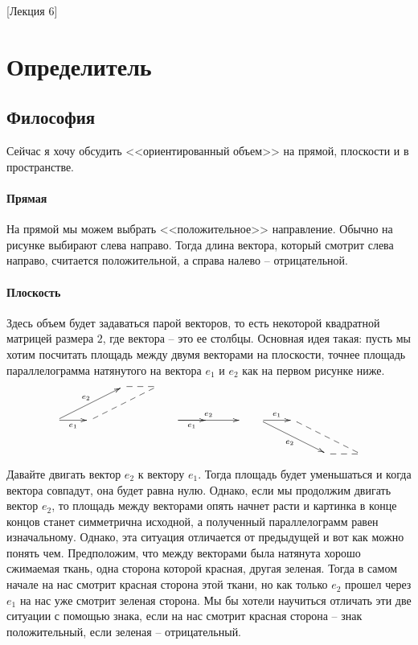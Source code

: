 [Лекция 6]

\newpage

\section{Определитель}

\subsection{Философия}

Сейчас я хочу обсудить <<ориентированный объем>> на прямой, плоскости и в пространстве. 

\paragraph{Прямая}

 На прямой мы можем выбрать <<положительное>> направление.
 Обычно на рисунке выбирают слева направо.
 Тогда длина вектора, который смотрит слева направо, считается положительной, а справа налево -- отрицательной.

\paragraph{Плоскость}

Здесь объем будет задаваться парой векторов, то есть некоторой квадратной матрицей размера $2$, где вектора -- это ее столбцы.
Основная идея такая: пусть мы хотим посчитать площадь между двумя векторами на плоскости, точнее площадь параллелограмма натянутого на вектора $e_1$ и $e_2$ как на первом рисунке ниже.
\[
\xymatrix{
	{}&{}&{}\ar@{--}[r]&{}\\
	{}\ar[urr]^{e_2}\ar[r]_{e_1}&{}\ar@{--}[urr]&{}&{}\\
	{}&{}&{}&{}\\
}\quad
\xymatrix{
	{}&{}&{}\\
	{}\ar[rr]^{e_2}\ar[r]_{e_1}&{}&{}\\
	{}&{}&{}\\
}\quad
\xymatrix{
	{}&{}&{}&{}\\
	{}\ar[drr]_{e_2}\ar[r]^{e_1}&{}\ar@{--}[drr]&{}&{}\\
	{}&{}&{}\ar@{--}[r]&{}\\
}
\]
Давайте двигать вектор $e_2$ к вектору $e_1$.
Тогда площадь будет уменьшаться и когда вектора совпадут, она будет равна нулю.
Однако, если мы продолжим двигать вектор $e_2$, то площадь между векторами опять начнет расти и картинка в конце концов станет симметрична исходной, а полученный параллелограмм равен изначальному.
Однако, эта ситуация отличается от предыдущей и вот как можно понять чем.
Предположим, что между векторами была натянута хорошо сжимаемая ткань, одна сторона которой красная, другая зеленая.
Тогда в самом начале на нас смотрит красная сторона этой ткани, но как только $e_2$ прошел через $e_1$ на нас уже смотрит зеленая сторона.
Мы бы хотели научиться отличать эти две ситуации с помощью знака, если на  нас смотрит красная сторона -- знак положительный, если зеленая -- отрицательный. 

